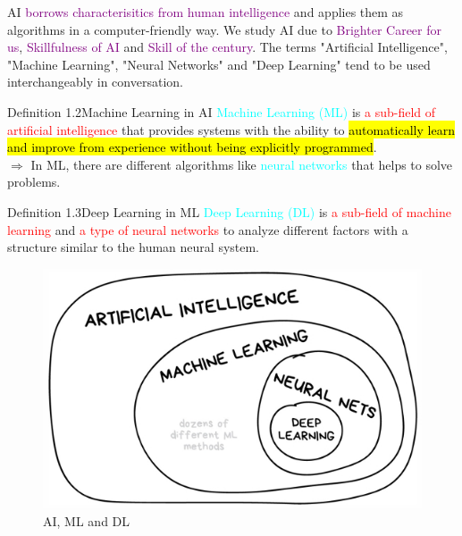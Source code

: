 \documentclass{book}
\begin{document}
AI \textcolor{purple}{borrows characterisitics from human intelligence} and applies them as algorithms in a computer-friendly way.\newline
We study AI due to \textcolor{purple}{Brighter Career for us}, \textcolor{purple}{Skillfulness of AI} and \textcolor{purple}{Skill of the century}.\newline
The terms "Artificial Intelligence", "Machine Learning", "Neural Networks" and "Deep Learning" tend to be used interchangeably in conversation.
\begin{defBox}[]{Definition 1.2}{Machine Learning in AI}
    \textcolor{cyan}{Machine Learning (ML)} is \textcolor{red}{a sub-field of artificial intelligence} that provides systems with the ability to \hl{automatically learn and improve from experience without being explicitly programmed}.\\
    $\Rightarrow$ In ML, there are different algorithms like \textcolor{cyan}{neural networks} that helps to solve problems.
\end{defBox}
\begin{defBox}[]{Definition 1.3}{Deep Learning in ML}
    \textcolor{cyan}{Deep Learning (DL)} is \textcolor{red}{a sub-field of machine learning} and \textcolor{red}{a type of neural networks} to analyze different factors with a structure similar to the human neural system.
\end{defBox}
\begin{figure}[h]
    \centering
    \includegraphics[scale=0.5]{images/Screenshot_20-12-2024_21499_.jpeg}
    \caption{AI, ML and DL}
\end{figure}
\end{document}
